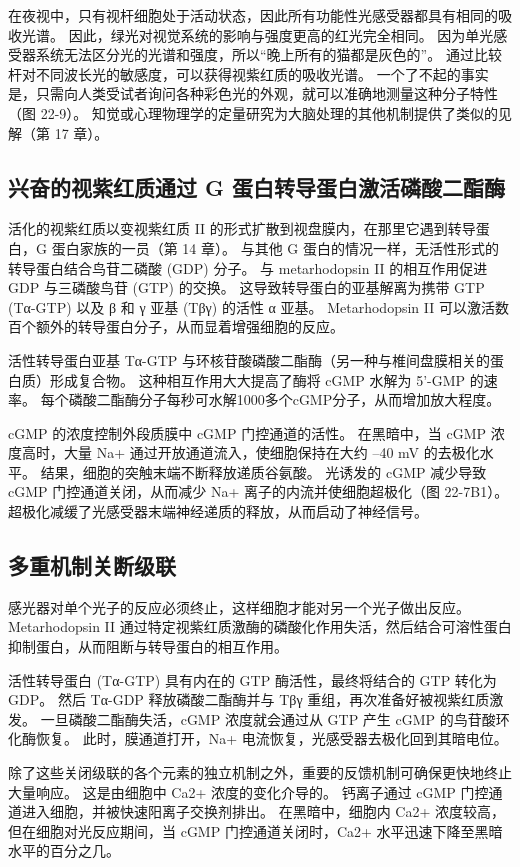 在夜视中，只有视杆细胞处于活动状态，因此所有功能性光感受器都具有相同的吸收光谱。 因此，绿光对视觉系统的影响与强度更高的红光完全相同。 因为单光感受器系统无法区分光的光谱和强度，所以“晚上所有的猫都是灰色的”。 通过比较杆对不同波长光的敏感度，可以获得视紫红质的吸收光谱。 一个了不起的事实是，只需向人类受试者询问各种彩色光的外观，就可以准确地测量这种分子特性（图 22-9）。 知觉或心理物理学的定量研究为大脑处理的其他机制提供了类似的见解（第 17 章）。

\subsection{兴奋的视紫红质通过 G 蛋白转导蛋白激活磷酸二酯酶}
活化的视紫红质以变视紫红质 II 的形式扩散到视盘膜内，在那里它遇到转导蛋白，G 蛋白家族的一员（第 14 章）。 与其他 G 蛋白的情况一样，无活性形式的转导蛋白结合鸟苷二磷酸 (GDP) 分子。 与 metarhodopsin II 的相互作用促进 GDP 与三磷酸鸟苷 (GTP) 的交换。 这导致转导蛋白的亚基解离为携带 GTP (Tα-GTP) 以及 β 和 γ 亚基 (Tβγ) 的活性 α 亚基。 Metarhodopsin II 可以激活数百个额外的转导蛋白分子，从而显着增强细胞的反应。

活性转导蛋白亚基 Tα-GTP 与环核苷酸磷酸二酯酶（另一种与椎间盘膜相关的蛋白质）形成复合物。 这种相互作用大大提高了酶将 cGMP 水解为 5'-GMP 的速率。 每个磷酸二酯酶分子每秒可水解1000多个cGMP分子，从而增加放大程度。

cGMP 的浓度控制外段质膜中 cGMP 门控通道的活性。 在黑暗中，当 cGMP 浓度高时，大量 Na+ 通过开放通道流入，使细胞保持在大约 –40 mV 的去极化水平。 结果，细胞的突触末端不断释放递质谷氨酸。 光诱发的 cGMP 减少导致 cGMP 门控通道关闭，从而减少 Na+ 离子的内流并使细胞超极化（图 22-7B1）。 超极化减缓了光感受器末端神经递质的释放，从而启动了神经信号。


\subsection{多重机制关断级联}
感光器对单个光子的反应必须终止，这样细胞才能对另一个光子做出反应。 Metarhodopsin II 通过特定视紫红质激酶的磷酸化作用失活，然后结合可溶性蛋白抑制蛋白，从而阻断与转导蛋白的相互作用。

活性转导蛋白 (Tα-GTP) 具有内在的 GTP 酶活性，最终将结合的 GTP 转化为 GDP。 然后 Tα-GDP 释放磷酸二酯酶并与 Tβγ 重组，再次准备好被视紫红质激发。 一旦磷酸二酯酶失活，cGMP 浓度就会通过从 GTP 产生 cGMP 的鸟苷酸环化酶恢复。 此时，膜通道打开，Na+ 电流恢复，光感受器去极化回到其暗电位。

除了这些关闭级联的各个元素的独立机制之外，重要的反馈机制可确保更快地终止大量响应。 这是由细胞中 Ca2+ 浓度的变化介导的。 钙离子通过 cGMP 门控通道进入细胞，并被快速阳离子交换剂排出。 在黑暗中，细胞内 Ca2+ 浓度较高，但在细胞对光反应期间，当 cGMP 门控通道关闭时，Ca2+ 水平迅速下降至黑暗水平的百分之几。


